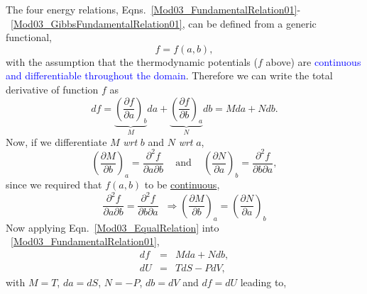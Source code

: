 \documentclass[12pts,a4paper,amsmath,amssymb,floatfix]{article}%
\newcommand{\frc}{\displaystyle\frac}
\newcommand{\blue}{\textcolor{blue}}
\newcommand{\wrt}{{\it wrt }}
\begin{document}
The four energy relations, Eqns.~\ref{Mod03_FundamentalRelation01}-~\ref{Mod03_GibbsFundamentalRelation01}, can be defined from a generic functional, 
   \begin{displaymath}
    f = f(a,b),
   \end{displaymath}
with the assumption that the thermodynamic potentials ($f$ above) are \blue{continuous and differentiable throughout the domain}. Therefore we can write the total derivative of function $f$ as
   \begin{displaymath}
         df = \underbrace{\left(\frc{\partial f}{\partial a}\right)_{b}}_{M}da + \underbrace{\left(\frc{\partial f}{\partial b}\right)_{a}}_{N}db = Mda + Ndb.
   \end{displaymath}
Now, if we differentiate $M$ \wrt $b$ and $N$ \wrt $a$,
   \begin{displaymath}
         \left(\frc{\partial M}{\partial b}\right)_{a} = \frc{\partial^{2}f}{\partial a\partial b} \;\;\;\text{ and }\;\;\; \left(\frc{\partial N}{\partial a}\right)_{b} = \frc{\partial^{2}f}{\partial b\partial a},
   \end{displaymath}
since we required that $f(a,b)$ to be \underline{continuous}, 
   \begin{equation}
         \frc{\partial^{2}f}{\partial a\partial b} = \frc{\partial^{2}f}{\partial b\partial a}\;\;\Longrightarrow \left(\frc{\partial M}{\partial b}\right)_{a} = \left(\frc{\partial N}{\partial a}\right)_{b}\label{Mod03_EqualRelation}
   \end{equation}
Now applying Eqn.~\ref{Mod03_EqualRelation} into ~\ref{Mod03_FundamentalRelation01},
   \begin{eqnarray}
        df &=& Mda + Ndb, \nonumber \\
        dU &=& TdS - PdV, \nonumber
   \end{eqnarray}
with $M=T$, $da=dS$, $N=-P$, $db = dV$ and $df = dU$ leading to,
\end{document}
